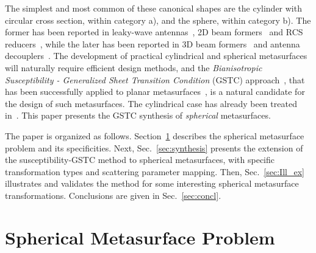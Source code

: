 \documentclass[journal,transaction]{IEEEtran}
\begin{document}
The simplest and most common of these canonical shapes are the cylinder with circular cross section, within category a), and the sphere, within category b). The former has been reported in leaky-wave antennas~\cite{cylinder_leakywave_balanis_2017}, 2D beam formers~\cite{cylinder_pattern_control_BR_2017} and RCS reducers~\cite{cylinder_RCS_ruduction}, while the later has been reported in 3D beam formers~\cite{sphere_patterns_impedance_Raeker2016} and antenna decouplers~\cite{sphere_surface_impedance_2014}. The development of practical cylindrical and spherical metasurfaces will naturally require efficient design methods, and the \emph{Bianisotropic Susceptibility - Generalized Sheet Transition Condition} (GSTC) approach~\cite{Averaged_GSTCs_Kuester2003,GSTCs_Idemen2011,synthesis_planar_KA2015}, that has been successfully applied to planar metasurfaces~\cite{synthesis_planar_KA2015}, is a natural candidate for the design of such metasurfaces. The cylindrical case has already been treated in~\cite{cylinder_susceptibility_Capolino2017}. This paper presents the GSTC synthesis of \emph{spherical} metasurfaces.

The paper is organized as follows. Section~\ref{sec:problem} describes the spherical metasurface problem and its specificities. Next, Sec.~\ref{sec:synthesis} presents the extension of the susceptibility-GSTC method to spherical metasurfaces, with specific transformation types and scattering parameter mapping. Then, Sec.~\ref{sec:Ill_ex} illustrates and validates the method for some interesting spherical metasurface transformations. Conclusions are given in Sec.~\ref{sec:concl}.


\section{Spherical Metasurface Problem}\label{sec:problem}
\end{document}
